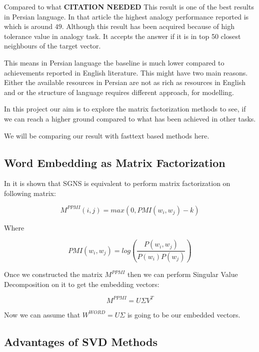 Compared to what \textbf{CITATION NEEDED} This result is one of the best results  in Persian language. In that article the highest analogy performance reported is which is around $49$. Although this result has been acquired because of high tolerance value in analogy task. It accepts the answer if it is in top 50 closest neighbours of the target vector. 

This means in Persian language the baseline is much lower compared to achievements reported in  English literature.  This might have two main reasons. Either the available resources in Persian are not as rich as resources in English and or the structure of language requires different approach,  for modelling. 


In this project our aim is to explore the matrix factorization methods to see, if we can reach a higher ground compared to what  has been achieved in other tasks. 

We will be comparing our result with    fasttext based methods here. 


\subsection{Word Embedding as Matrix Factorization}

In \cite{NIPS2014_5477} it is shown that SGNS is equivalent to perform matrix factorization on  following matrix: 

\begin{equation}
    M^{PPMI} (i,j) = max(0 , PMI(w_i , w_j) - k )
\end{equation}

Where 

\begin{equation}
    PMI(w_i , w_j) = log \left( \frac{P(w_i, w_j)}{P(w_i)P(w_j)} \right)
\end{equation}

Once we constructed the matrix $M^{PPMI}$  then we can perform Singular Value Decomposition on it to get the embedding vectors:  

\begin{equation}
    M^{PPMI} = U \Sigma V^{T}  
\end{equation}

Now we can assume that  $W^{WORD} = U \Sigma$ is going to be our embedded vectors. 

\subsection{Advantages of SVD Methods}
